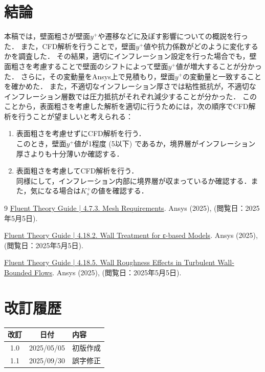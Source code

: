 \documentclass[uplatex,dvipdfmx,a4j,12pt]{jsarticle}
\begin{document}
\section{結論}
本稿では，壁面粗さが壁面$y^+$や遷移などに及ぼす影響についての概説を行った．
また，CFD解析を行うことで，壁面$y^+$値や抗力係数がどのように変化するかを調査した．
その結果，適切にインフレーション設定を行った場合でも，壁面粗さを考慮することで壁面のシフトによって壁面$y^+$値が増大することが分かった．
さらに，その変動量をAnsys上で見積もり，壁面$y^+$の変動量と一致することを確かめた．
また，不適切なインフレーション厚さでは粘性抵抗が，不適切なインフレーション層数では圧力抵抗がそれぞれ減少することが分かった．
このことから，表面粗さを考慮した解析を適切に行うためには，次の順序でCFD解析を行うことが望ましいと考えられる：
\begin{enumerate}
  \item 表面粗さを考慮せずにCFD解析を行う．\\
  このとき，壁面$y^+$値が1程度 (5以下) であるか，境界層がインフレーション厚さよりも十分薄いか確認する．
  \item 表面粗さを考慮してCFD解析を行う．\\
  同様にして，インフレーション内部に境界層が収まっているか確認する．また，気になる場合は$K_s^+$の値を確認する．
\end{enumerate}




\begin{thebibliography}{9}
    \href{https://ansyshelp.ansys.com/public///Views/Secured/corp/v251/en/flu_th/flu_th_sec_turb_sst_grid.html}{Fluent Theory Guide | 4.7.3. Mesh Requirements}. Ansys (2025), (閲覧日：2025年5月5日).

    \href{https://ansyshelp.ansys.com/public//Views/Secured/corp/v251/en/flu_th/ch04s18s02.html}{Fluent Theory Guide | 4.18.2. Wall Treatment for ε-based Models}. Ansys (2025), (閲覧日：2025年5月5日).
  
    \href{https://ansyshelp.ansys.com/public//Views/Secured/corp/v251/en/flu_th/x1-5720008.164.html}{Fluent Theory Guide | 4.18.5. Wall Roughness Effects in Turbulent Wall-Bounded Flows}. Ansys (2025), (閲覧日：2025年5月5日).
  
\end{thebibliography}

\section*{改訂履歴}

\begin{table}[H]
  \centering
  \begin{tabular}{c|c|l}
    \hline
    改訂 & 日付 & 内容 \\
    \hline\hline
    1.0 & 2025/05/05 & 初版作成 \\
    1.1 & 2025/09/30 & 誤字修正 \\
    \hline
  \end{tabular}
\end{table}
\end{document}
